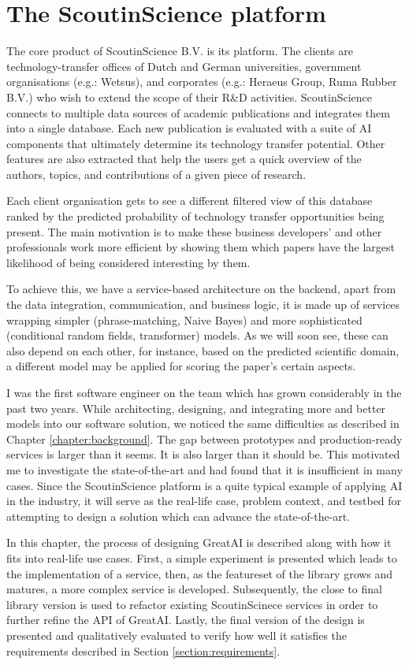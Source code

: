\chapter{The ScoutinScience platform} \label{chapter:case}

The core product of ScoutinScience B.V. is its platform. The clients are technology-transfer offices of Dutch and German universities, government organisations (e.g.: Wetsus), and corporates (e.g.: Heraeus Group, Ruma Rubber B.V.) who wish to extend the scope of their R\&D activities. ScoutinScience connects to multiple data sources of academic publications and integrates them into a single database. Each new publication is evaluated with a suite of AI components that ultimately determine its technology transfer potential. Other features are also extracted that help the users get a quick overview of the authors, topics, and contributions of a given piece of research.

Each client organisation gets to see a different filtered view of this database ranked by the predicted probability of technology transfer opportunities being present. The main motivation is to make these business developers' and other professionals work more efficient by showing them which papers have the largest likelihood of being considered interesting by them. 

To achieve this, we have a service-based architecture \cite{kleppmann2017designing} on the backend, apart from the data integration, communication, and business logic, it is made up of services wrapping simpler (phrase-matching, Naive Bayes) and more sophisticated (conditional random fields, transformer) models. As we will soon see, these can also depend on each other, for instance, based on the predicted scientific domain, a different model may be applied for scoring the paper's certain aspects.

I was the first software engineer on the team which has grown considerably in the past two years. While architecting, designing, and integrating more and better models into our software solution, we noticed the same difficulties as described in Chapter \ref{chapter:background}. The gap between prototypes and production-ready services is larger than it seems. It is also larger than it should be. This motivated me to investigate the state-of-the-art and had found that it is insufficient in many cases. Since the ScoutinScience platform is a quite typical example of applying AI in the industry, it will serve as the real-life case, problem context, and testbed for attempting to design a solution which can advance the state-of-the-art.

In this chapter, the process of designing GreatAI is described along with how it fits into real-life use cases. First, a simple experiment is presented which leads to the implementation of a service, then, as the featureset of the library grows and matures, a more complex service is developed. Subsequently, the close to final library version is used to refactor existing ScoutinScinece services in order to further refine the API of GreatAI. Lastly, the final version of the design is presented and qualitatively evaluated to verify how well it satisfies the requirements described in Section \ref{section:requirements}.
